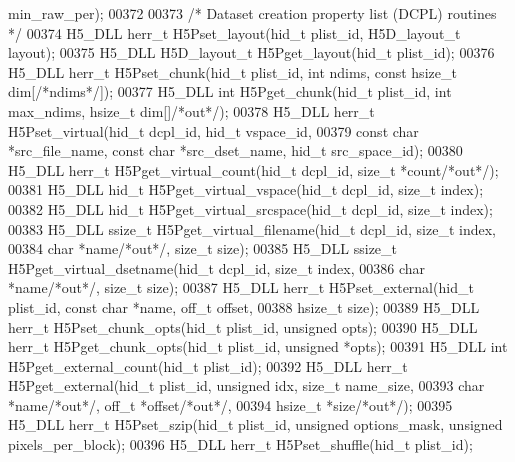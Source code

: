 \begin{DoxyCode}
      min\_raw\_per);
00372 
00373 \textcolor{comment}{/* Dataset creation property list (DCPL) routines */}
00374 H5\_DLL herr\_t H5Pset\_layout(hid\_t plist\_id, H5D\_layout\_t layout);
00375 H5\_DLL H5D\_layout\_t H5Pget\_layout(hid\_t plist\_id);
00376 H5\_DLL herr\_t H5Pset\_chunk(hid\_t plist\_id, \textcolor{keywordtype}{int} ndims, \textcolor{keyword}{const} hsize\_t dim[\textcolor{comment}{/*ndims*/}]);
00377 H5\_DLL \textcolor{keywordtype}{int} H5Pget\_chunk(hid\_t plist\_id, \textcolor{keywordtype}{int} max\_ndims, hsize\_t dim[]\textcolor{comment}{/*out*/});
00378 H5\_DLL herr\_t H5Pset\_virtual(hid\_t dcpl\_id, hid\_t vspace\_id,
00379     \textcolor{keyword}{const} \textcolor{keywordtype}{char} *src\_file\_name, \textcolor{keyword}{const} \textcolor{keywordtype}{char} *src\_dset\_name, hid\_t src\_space\_id);
00380 H5\_DLL herr\_t H5Pget\_virtual\_count(hid\_t dcpl\_id, \textcolor{keywordtype}{size\_t} *count\textcolor{comment}{/*out*/});
00381 H5\_DLL hid\_t H5Pget\_virtual\_vspace(hid\_t dcpl\_id, \textcolor{keywordtype}{size\_t} index);
00382 H5\_DLL hid\_t H5Pget\_virtual\_srcspace(hid\_t dcpl\_id, \textcolor{keywordtype}{size\_t} index);
00383 H5\_DLL ssize\_t H5Pget\_virtual\_filename(hid\_t dcpl\_id, \textcolor{keywordtype}{size\_t} index,
00384     \textcolor{keywordtype}{char} *name\textcolor{comment}{/*out*/}, \textcolor{keywordtype}{size\_t} size);
00385 H5\_DLL ssize\_t H5Pget\_virtual\_dsetname(hid\_t dcpl\_id, \textcolor{keywordtype}{size\_t} index,
00386     \textcolor{keywordtype}{char} *name\textcolor{comment}{/*out*/}, \textcolor{keywordtype}{size\_t} size);
00387 H5\_DLL herr\_t H5Pset\_external(hid\_t plist\_id, \textcolor{keyword}{const} \textcolor{keywordtype}{char} *name, off\_t offset,
00388           hsize\_t size);
00389 H5\_DLL herr\_t H5Pset\_chunk\_opts(hid\_t plist\_id, \textcolor{keywordtype}{unsigned} opts);
00390 H5\_DLL herr\_t H5Pget\_chunk\_opts(hid\_t plist\_id, \textcolor{keywordtype}{unsigned} *opts);
00391 H5\_DLL \textcolor{keywordtype}{int} H5Pget\_external\_count(hid\_t plist\_id);
00392 H5\_DLL herr\_t H5Pget\_external(hid\_t plist\_id, \textcolor{keywordtype}{unsigned} idx, \textcolor{keywordtype}{size\_t} name\_size,
00393           \textcolor{keywordtype}{char} *name\textcolor{comment}{/*out*/}, off\_t *offset\textcolor{comment}{/*out*/},
00394           hsize\_t *size\textcolor{comment}{/*out*/});
00395 H5\_DLL herr\_t H5Pset\_szip(hid\_t plist\_id, \textcolor{keywordtype}{unsigned} options\_mask, \textcolor{keywordtype}{unsigned} pixels\_per\_block);
00396 H5\_DLL herr\_t H5Pset\_shuffle(hid\_t plist\_id);

\end{DoxyCode}
